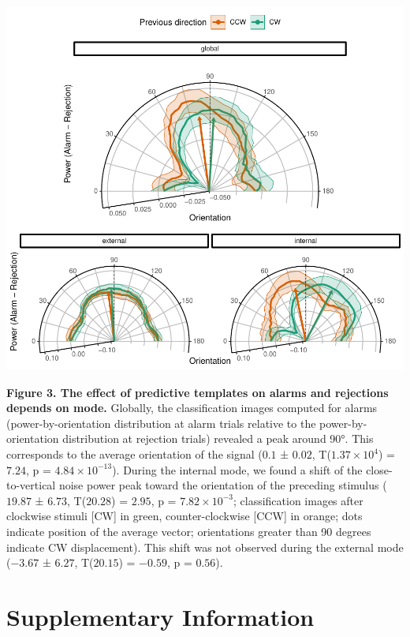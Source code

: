 \documentclass[
]{article}
\begin{document}
\includegraphics{predictive_templates_files/figure-latex/rev_Figure_3-1.pdf}

\textbf{Figure 3. The effect of predictive templates on alarms and
rejections depends on mode.} Globally, the classification images
computed for alarms (power-by-orientation distribution at alarm trials
relative to the power-by-orientation distribution at rejection trials)
revealed a peak around 90°. This corresponds to the average orientation
of the signal (\(0.1\) ± \(0.02\), T(\(\ensuremath{1.37\times 10^{4}}\))
= \(7.24\), p = \(\ensuremath{4.84\times 10^{-13}}\)). During the
internal mode, we found a shift of the close-to-vertical noise power
peak toward the orientation of the preceding stimulus (\(19.87\) ±
\(6.73\), T(\(20.28\)) = \(2.95\), p =
\(\ensuremath{7.82\times 10^{-3}}\); classification images after
clockwise stimuli {[}CW{]} in green, counter-clockwise {[}CCW{]} in
orange; dots indicate position of the average vector; orientations
greater than 90 degrees indicate CW displacement). This shift was not
observed during the external mode (\(-3.67\) ± \(6.27\), T(\(20.15\)) =
\(-0.59\), p = \(0.56\)).

\newpage

\hypertarget{supplementary-information}{%
\section{Supplementary Information}\label{supplementary-information}}
\end{document}

